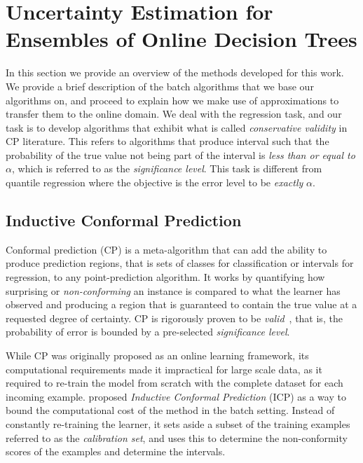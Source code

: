 \section{Uncertainty Estimation for Ensembles of Online Decision Trees}
\label{sec:uncertain-trees-method}

In this section we provide an overview of the methods developed for this work.
We provide a brief description of the batch algorithms that we base our algorithms
on, and proceed to explain how we make use of approximations to transfer them to
the online domain. We deal with the regression task, and our task is to develop algorithms
that exhibit what is called \emph{conservative validity} in CP literature. This refers
to algorithms that produce interval such that the probability of the true value not
being part of the interval is \emph{less than or equal to} $\alpha$, which is referred
to as the \emph{significance level}. This task is different from quantile regression \cite{koenker2005qr}
where the objective is the error level to be \emph{exactly} $\alpha$.

\subsection{Inductive Conformal Prediction}

Conformal prediction (CP) is a meta-algorithm that can add the ability to
produce prediction regions, that is sets of classes for classification or
intervals for regression, to any point-prediction algorithm. It works by
quantifying how surprising or \emph{non-conforming} an instance is compared
to what the learner has observed and producing a region that is guaranteed
to contain the true value at a requested degree of certainty. CP is rigorously
proven to be \textit{valid}~\cite{vovk2005algorithmic}, that is, the probability of error is bounded
by a pre-selected \emph{significance level}.

While CP was originally proposed as an online learning framework, its computational
requirements made it impractical for large scale data, as it required to re-train
the model from scratch with the complete dataset for each incoming example.
\citet{papadopoulos2002icp} proposed \emph{Inductive Conformal Prediction} (ICP) as
a way to bound the computational cost of the method in the batch setting.
Instead of constantly re-training the learner, it sets aside a subset
of the training examples referred to as the \emph{calibration set},
and uses this to determine the non-conformity scores of the examples
and determine the intervals.

